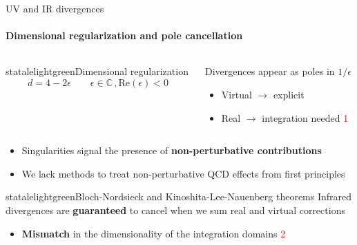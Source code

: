 
\begin{frame} {UV and IR divergences}
  \framesubtitle{Dimensional regularization and pole cancellation}

  \begin{columns}

    \begin{column}{0.5\textwidth}
    \begin{colorblock}[black]{statalelightgreen}{Dimensional regularization}
        \begin{equation*}
            d=4-2\epsilon \qquad \epsilon \in \mathbb{C} \, , \mathrm{Re}(\epsilon)<0
        \end{equation*}
      \end{colorblock}
    \end{column}

    \begin{column}{0.5\textwidth}
    Divergences appear as poles in $1/\epsilon$ \\
    \begin{itemize}
        \item Virtual $\to$ explicit
        \item Real $\to$ integration needed \textcolor{red}{\textcircled{1}}
    \end{itemize}
    \end{column}
    \end{columns}

    \vspace{1.5em}

    \begin{itemize}
        \item Singularities signal the presence of \textbf{non-perturbative contributions}
        \item We lack methods to treat non-perturbative QCD effects from first principles
    \end{itemize}

    \vspace{1.em}

    \begin{colorblock}[black]{statalelightgreen}{Bloch-Nordsieck and Kinoshita-Lee-Nauenberg theorems}
            Infrared divergences are \textbf{guaranteed} to cancel when we sum real and virtual corrections
      \end{colorblock}

      \begin{itemize}
        \item \textbf{Mismatch} in the dimensionality of the integration domains \textcolor{red}{\textcircled{2}}
    \end{itemize}
\end{frame}

